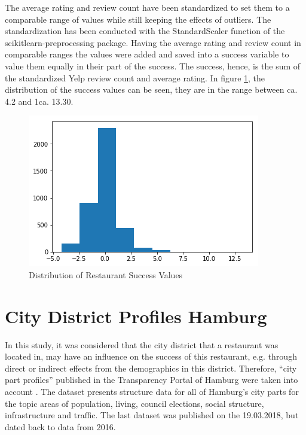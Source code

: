 \documentclass[a4paper, 11pt, oneside]{Thesis}  %
\begin{document}
The average rating and review count have been standardized to set them to a comparable range of values while still keeping the effects of outliers. The standardization has been conducted with the StandardScaler function of the scikitlearn-preprocessing package. Having the average rating and review count in comparable ranges the values were added and saved into a success variable to value them equally in their part of the success. The success, hence, is the sum of the standardized Yelp review count and average rating. In figure \ref{fig:restaurant_success_distribution}, the distribution of the success values can be seen, they are in the range between ca. 4.2 and 1ca. 13.30.

\begin{figure}[h]
\includegraphics[scale=0.5]{Figures/restaurant_success_distribution.png}
\centering
\caption{Distribution of Restaurant Success Values}
\label{fig:restaurant_success_distribution}
\end{figure}


\section{City District Profiles Hamburg}

In this study, it was considered that the city district that a restaurant was located in, may have an influence on the success of this restaurant, e.g. through direct or indirect effects from the demographics in this district. Therefore, ``city part profiles'' published in the Transparency Portal of Hamburg were taken into account \cite{Profiles2018}. The dataset presents structure data for all of Hamburg's city parts for the topic areas of population, living, council elections, social structure, infrastructure and traffic. The last dataset was published on the 19.03.2018, but dated back to data from 2016.
\end{document}
